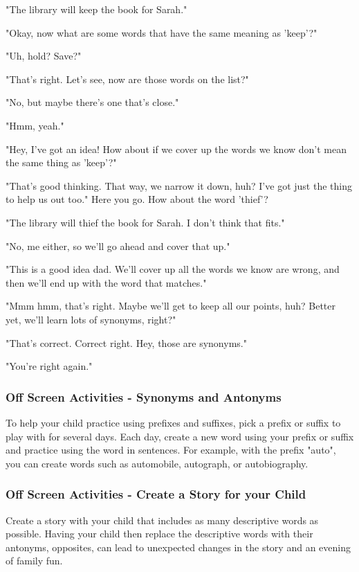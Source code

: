 "The library will keep the book for Sarah."

"Okay, now what are some words that have the same meaning as 'keep'?"

"Uh, hold? Save?"

"That's right.
Let's see, now are those words on the list?"

"No, but maybe there's one that's close."

"Hmm, yeah."

"Hey, I've got an idea!
How about if we cover up the words we know don't mean the same thing as 'keep'?"

"That's good thinking.
That way, we narrow it down, huh?
I've got just the thing to help us out too."
Here you go.
How about the word 'thief'?

"The library will thief the book for Sarah.
I don't think that fits."

"No, me either, so we'll go ahead and cover that up."

"This is a good idea dad. We'll cover up all the words we know are wrong, and then we'll end up with the word that matches."

"Mmm hmm, that's right. Maybe we'll get to keep all our points, huh?
Better yet, we'll learn lots of synonyms, right?"

"That's correct. Correct right. Hey, those are synonyms."

"You're right again."

\subsubsection{Off Screen Activities - Synonyms and Antonyms}

To help your child practice using prefixes and suffixes, pick a prefix or suffix to play with for several days.
Each day, create a new word using your prefix or suffix and practice using the word in sentences.
For example, with the prefix "auto", you can create words such as automobile, autograph, or autobiography.

\subsubsection{Off Screen Activities - Create a Story for your Child}

Create a story with your child that includes as many descriptive words as possible.
Having your child then replace the descriptive words with their antonyms, opposites, can lead to unexpected changes in the story and an evening of family fun.

